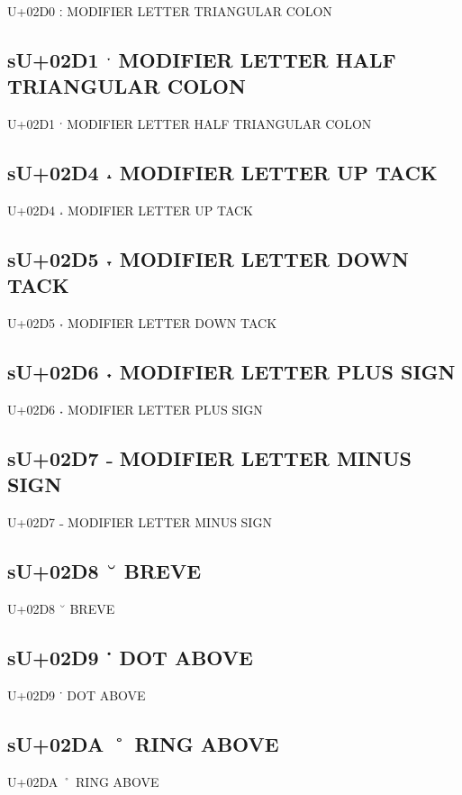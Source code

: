 U+02D0 ː MODIFIER LETTER TRIANGULAR COLON

\subsection{sU+02D1 ˑ MODIFIER LETTER HALF TRIANGULAR COLON}

U+02D1 ˑ MODIFIER LETTER HALF TRIANGULAR COLON

\subsection{sU+02D4 ˔ MODIFIER LETTER UP TACK}

U+02D4 ˔ MODIFIER LETTER UP TACK

\subsection{sU+02D5 ˕ MODIFIER LETTER DOWN TACK}

U+02D5 ˕ MODIFIER LETTER DOWN TACK

\subsection{sU+02D6 ˖ MODIFIER LETTER PLUS SIGN}

U+02D6 ˖ MODIFIER LETTER PLUS SIGN

\subsection{sU+02D7 ˗ MODIFIER LETTER MINUS SIGN}

U+02D7 ˗ MODIFIER LETTER MINUS SIGN

\subsection{sU+02D8 ˘  BREVE}

U+02D8 ˘  BREVE

\subsection{sU+02D9 ˙ DOT ABOVE}

U+02D9 ˙ DOT ABOVE

\subsection{sU+02DA ˚ RING ABOVE}

U+02DA ˚ RING ABOVE

